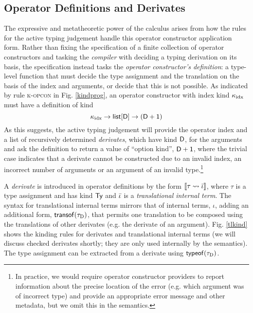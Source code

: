 \documentclass[9pt,preprint]{sigplanconf}
\begin{document}
\subsection{Operator Definitions and Derivates}
The expressive and metatheoretic power of the calculus arises from how the rules for the active typing judgement handle this  operator constructor application form. Rather than fixing the specification of a finite collection of operator constructors and tasking the \emph{compiler} with deciding a typing derivation on its basis, the specification instead tasks the \emph{operator constructor's definition}: {a type-level function that must decide the type assignment and the translation on the basis of the index and arguments, or decide that this is not possible}. As indicated by rule \textsc{k-opcon} in Fig. \ref{kindprog}, an operator constructor with index kind $\kappa_{\text{idx}}$ must have a definition of kind $$\kappa_{\text{idx}} \rightarrow \textsf{list}[\textsf{D}] \rightarrow (\textsf{D} + \textsf{1})$$ As this suggests, the active typing judgement  will provide the operator index and a list of {recursively determined \emph{derivates}}, which have kind $\textsf{D}$, for the arguments and ask the definition to return a value of ``option kind'', $\textsf{D} + \textsf{1}$, where the trivial case indicates that a derivate cannot be constructed due to an invalid index, an incorrect number of arguments or an argument of an invalid type.\footnote{In practice, we would require operator constructor providers to report information about the precise location of the error (e.g. which argument was of incorrect type) and provide an appropriate error message and other metadata, but we omit this in the semantics.}

A \emph{derivate} is introduced in operator definitions by the form $\llbracket \tau \leadsto {\bar \iota} \rrbracket$, where $\tau$ is a type assignment and has kind $\textsf{Ty}$ and ${\bar \iota}$ is a \emph{translational internal term}. The syntax for translational internal terms mirrors that of internal terms, $\iota$, adding an additional form, ${\sf transof}({\tau_{\text{D}}})$, that permits one translation to be composed using the translations of other derivates (e.g. the derivate of an argument). Fig. \ref{tlkind} shows the kinding rules for derivates and translational internal terms (we will discuss checked derivates shortly; they are only used internally by the semantics). The type assignment can be extracted from a derivate using ${\sf typeof}({\tau_{\text{D}}})$.
\end{document}
